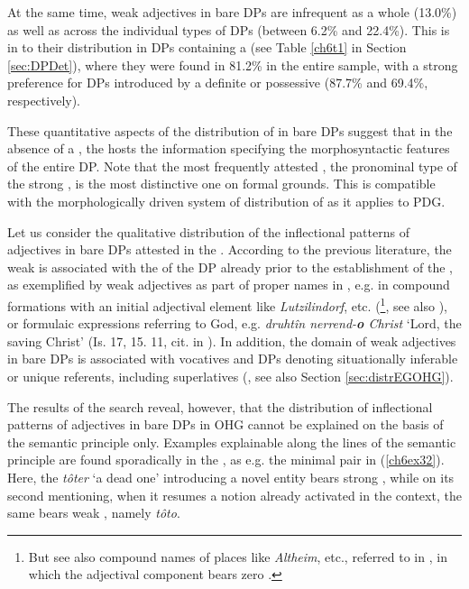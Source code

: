 \documentclass[output=paper,colorlinks,citecolor=brown]{langscibook}
\begin{document}
At the same time, weak adjectives in bare DPs are infrequent as a whole
(13.0\%) as well as across the individual types of DPs (between 6.2\%
and 22.4\%). This is in  to their distribution in DPs containing
a  (see Table \ref{ch6t1} in Section \ref{sec:DPDet}), where they were found in 81.2\%
in the entire sample, with a strong preference for DPs introduced by a
definite or possessive  (87.7\% and 69.4\%, respectively).

These quantitative aspects of the distribution of 
in bare DPs suggest that in the absence of a , the 
hosts the information specifying the morphosyntactic features of the
entire DP. Note that the most frequently attested , the
pronominal type of the strong , is the most distinctive one on
formal grounds. This is compatible with the morphologically driven
system of distribution of  as it applies to PDG.

Let us consider the qualitative distribution of the inflectional
patterns of adjectives in bare DPs attested in the . According to
the previous literature, the weak  is associated with the
 of the DP already prior to the establishment of the
, as exemplified by weak adjectives as part of proper
names in  \citep[191--196]{Delbruck09}, e.g. in compound formations
with an initial adjectival element like \emph{Lutzilindorf}, etc. (\cite[310]{Braune2018AHD}\footnote{But see also compound names of places like
  \emph{Altheim}, etc., referred to in \citet[299]{Braune2018AHD}, in which the
  adjectival component bears zero .}, see also \citealp{Kogel89}), or
formulaic expressions referring to God, e.g. \emph{druhtîn
nerrend-\textbf{o} Christ} `Lord, the saving Christ' (Is. 17, 15. 11,
cit. in \citealp[748]{Wilmanns09}). In addition, the domain of weak adjectives
in bare DPs is associated with vocatives and DPs denoting situationally
inferable or unique referents, including superlatives (\citealp{Demske01}, see
also Section \ref{sec:distrEGOHG}).

The results of the  search reveal, however, that the distribution
of inflectional patterns of adjectives in bare DPs in OHG cannot be
explained on the basis of the semantic principle only. Examples
explainable along the lines of the semantic principle are found
sporadically in the , as e.g. the minimal pair in (\ref{ch6ex32}). Here, the
 \emph{tôter} `a dead one' introducing a novel entity bears
strong , while on its second mentioning, when it resumes a
notion already activated in the context, the same  bears weak
, namely \emph{tôto}.
\end{document}
